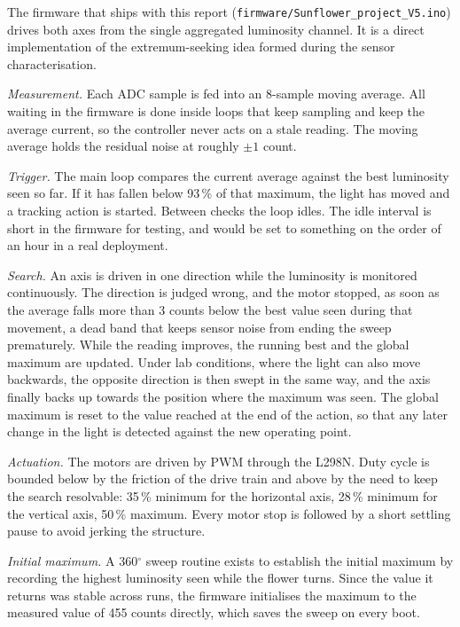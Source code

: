 \documentclass[10pt, conference, letterpaper]{IEEEtran}
\begin{document}
The firmware that ships with this report (\texttt{firmware/Sunflower\_project\_V5.ino}) drives both axes from the single aggregated luminosity channel. It is a direct implementation of the extremum-seeking idea formed during the sensor characterisation.

\emph{Measurement.} Each ADC sample is fed into an 8-sample moving average. All waiting in the firmware is done inside loops that keep sampling and keep the average current, so the controller never acts on a stale reading. The moving average holds the residual noise at roughly $\pm 1$ count.

\emph{Trigger.} The main loop compares the current average against the best luminosity seen so far. If it has fallen below 93\,\% of that maximum, the light has moved and a tracking action is started. Between checks the loop idles. The idle interval is short in the firmware for testing, and would be set to something on the order of an hour in a real deployment.

\emph{Search.} An axis is driven in one direction while the luminosity is monitored continuously. The direction is judged wrong, and the motor stopped, as soon as the average falls more than 3 counts below the best value seen during that movement, a dead band that keeps sensor noise from ending the sweep prematurely. While the reading improves, the running best and the global maximum are updated. Under lab conditions, where the light can also move backwards, the opposite direction is then swept in the same way, and the axis finally backs up towards the position where the maximum was seen. The global maximum is reset to the value reached at the end of the action, so that any later change in the light is detected against the new operating point.

\emph{Actuation.} The motors are driven by PWM through the L298N. Duty cycle is bounded below by the friction of the drive train and above by the need to keep the search resolvable: 35\,\% minimum for the horizontal axis, 28\,\% minimum for the vertical axis, 50\,\% maximum. Every motor stop is followed by a short settling pause to avoid jerking the structure.

\emph{Initial maximum.} A 360$^{\circ}$ sweep routine exists to establish the initial maximum by recording the highest luminosity seen while the flower turns. Since the value it returns was stable across runs, the firmware initialises the maximum to the measured value of 455 counts directly, which saves the sweep on every boot.
\end{document}
